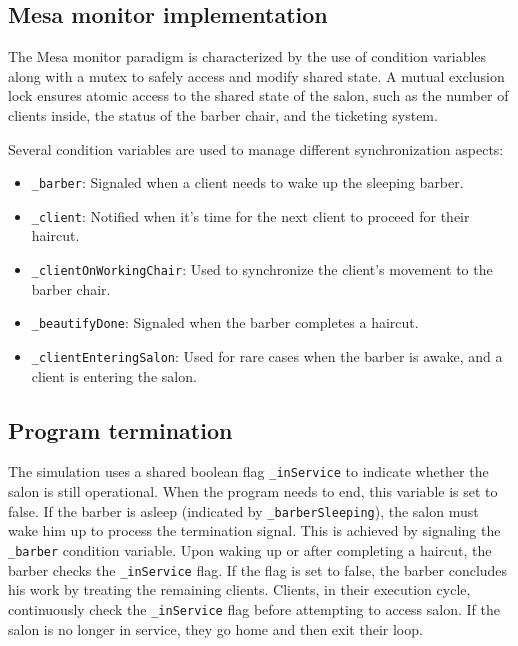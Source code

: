 \documentclass{article}
\begin{document}
    \subsection{Mesa monitor implementation}

    The Mesa monitor paradigm is characterized by the use of condition variables along with a mutex to safely access and modify shared state.
    A mutual exclusion lock ensures atomic access to the shared state of the salon, such as the number of clients inside, the status of the barber chair, and the ticketing system.

    Several condition variables are used to manage different synchronization aspects:
    \begin{itemize}
        \item \texttt{\_barber}: Signaled when a client needs to wake up the sleeping barber.
        \item \texttt{\_client}: Notified when it's time for the next client to proceed for their haircut.
        \item \texttt{\_clientOnWorkingChair}: Used to synchronize the client's movement to the barber chair.
        \item \texttt{\_beautifyDone}: Signaled when the barber completes a haircut.
        \item \texttt{\_clientEnteringSalon}: Used for rare cases when the barber is awake, and a client is entering the salon.
    \end{itemize}

    \subsection{Program termination}
    The simulation uses a shared boolean flag \texttt{\_inService} to indicate whether the salon is still operational.
    When the program needs to end, this variable is set to false.
    If the barber is asleep (indicated by \texttt{\_barberSleeping}), the salon must wake him up to process the termination signal.
    This is achieved by signaling the \texttt{\_barber} condition variable.
    Upon waking up or after completing a haircut, the barber checks the \texttt{\_inService} flag.
    If the flag is set to false, the barber concludes his work by treating the remaining clients.
    Clients, in their execution cycle, continuously check the \texttt{\_inService} flag before attempting to access salon.
    If the salon is no longer in service, they go home and then exit their loop.
\end{document}
